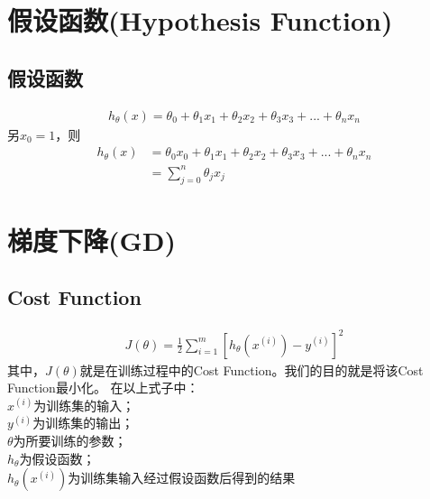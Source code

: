 \section{假设函数(Hypothesis Function)}
\subsection{假设函数}
\begin{equation}\begin{aligned}
	h_\theta(x) = \theta_0 + \theta_1x_1 + \theta_2x_2 + \theta_3x_3 + ... + \theta_nx_n
\end{aligned}\end{equation}
另$x_0=1$，则
\begin{equation}\begin{aligned}
	h_\theta(x) &= \theta_0x_0 + \theta_1x_1 + \theta_2x_2 + \theta_3x_3 + ... + \theta_nx_n \\
	&= \sum_{j=0}^n{\theta_jx_j}
\end{aligned}\end{equation}

\section{梯度下降(GD)}
\subsection{Cost Function}
\begin{equation}\begin{aligned}
	J(\theta) = \frac{1}{2} \sum_{i=1}^m \left[h_{\theta} {(x^{(i)})} - y^{(i)}\right]^2
\end{aligned}\end{equation}
其中，$J(\theta)$就是在训练过程中的Cost Function。我们的目的就是将该Cost Function最小化。
在以上式子中：\\
	$x^{(i)}$为训练集的输入；\\
	$y^{(i)}$为训练集的输出；\\
	$\theta$为所要训练的参数；\\
	$h_{\theta}$为假设函数；\\
	$h_{\theta} {(x^{(i)})}$为训练集输入经过假设函数后得到的结果\\


